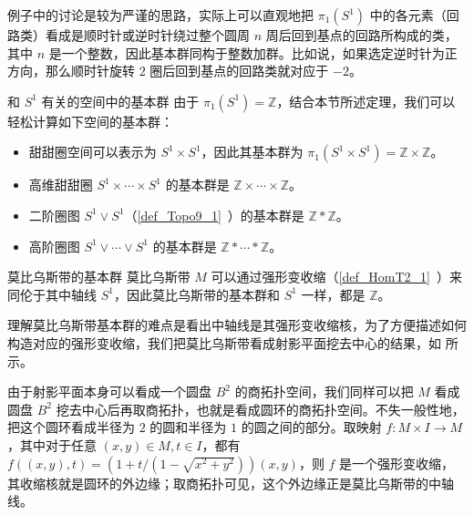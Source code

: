 例子中的讨论是较为严谨的思路，实际上可以直观地把 $\pi_1(S^1)$ 中的各元素（回路类）看成是顺时针或逆时针绕过整个圆周 $n$ 周后回到基点的回路所构成的类，其中 $n$ 是一个整数，因此基本群同构于整数加群。比如说，如果选定逆时针为正方向，那么顺时针旋转 $2$ 圈后回到基点的回路类就对应于 $-2$。


\begin{example}{和 $S^1$ 有关的空间中的基本群}
由于 $\pi_1(S^1)=\mathbb{Z}$，结合本节所述定理，我们可以轻松计算如下空间的基本群：
\begin{itemize}
\item 甜甜圈空间可以表示为 $S^1\times S^1$，因此其基本群为 $\pi_1(S^1\times S^1)=\mathbb{Z}\times\mathbb{Z}$。
\item 高维甜甜圈 $S^1\times\cdots\times S^1$ 的基本群是 $\mathbb{Z}\times\cdots\times\mathbb{Z}$。
\item 二阶圈图 $S^1\vee S^1$（\autoref{def_Topo9_1}~）的基本群是 $\mathbb{Z}*\mathbb{Z}$。
\item 高阶圈图 $S^1\vee\cdots\vee S^1$ 的基本群是 $\mathbb{Z}*\cdots*\mathbb{Z}$。
\end{itemize}

\end{example}

\begin{example}{莫比乌斯带的基本群}\label{ex_HomT5_1}
莫比乌斯带 $M$ 可以通过强形变收缩（\autoref{def_HomT2_1}~）来同伦于其中轴线 $S^1$，因此莫比乌斯带的基本群和 $S^1$ 一样，都是 $\mathbb{Z}$。

理解莫比乌斯带基本群的难点是看出中轴线是其强形变收缩核，为了方便描述如何构造对应的强形变收缩，我们把莫比乌斯带看成射影平面挖去中心的结果，如%
所示。


由于射影平面本身可以看成一个圆盘 $B^2$ 的商拓扑空间，我们同样可以把 $M$ 看成圆盘 $B^2$ 挖去中心后再取商拓扑，也就是看成圆环的商拓扑空间。不失一般性地，把这个圆环看成半径为 $2$ 的圆和半径为 $1$ 的圆之间的部分。取映射 $f:M\times I\rightarrow M$，其中对于任意 $(x, y)\in M, t\in I$，都有 $f((x, y), t)= (1+t/(1-\sqrt{x^2+y^2}))(x, y)$，则 $f$ 是一个强形变收缩，其收缩核就是圆环的外边缘；取商拓扑可见，这个外边缘正是莫比乌斯带的中轴线。
\end{example}

